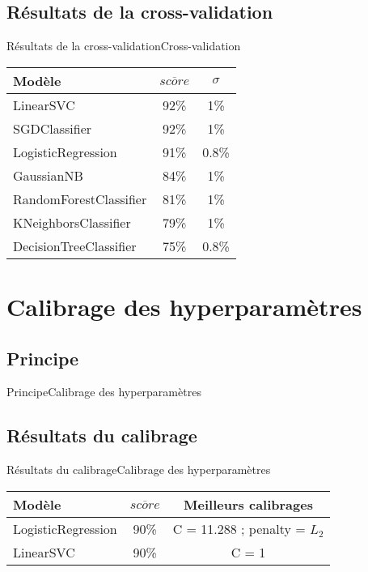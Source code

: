\documentclass[usenames,dvipsnames]{beamer}
\newcommand*\mean[1]{\overline{#1}}
\begin{document}
\subsection{Résultats de la cross-validation}
\begin{frame}{Résultats de la cross-validation}{Cross-validation}
\begin{table}
  \centering
  \begin{tabular}{|p{5cm}|c|c|}
    \hline
    \textbf{Modèle} & $\mean{score}$ & $\sigma$\\
    \hline
    \hline
    LinearSVC & 92\% & 1\%\\
    \hline
    SGDClassifier & 92\% & 1\%\\
    \hline
    LogisticRegression & 91\% & 0.8\%\\
    \hline
    GaussianNB & 84\% & 1\%\\
    \hline
    RandomForestClassifier & 81\% & 1\%\\
    \hline
    KNeighborsClassifier & 79\% & 1\%\\
    \hline
    DecisionTreeClassifier & 75\% & 0.8\%\\
    \hline
  \end{tabular}
\end{table}
\end{frame}

\section{Calibrage des hyperparamètres}
\subsection{Principe}
\begin{frame}{Principe}{Calibrage des hyperparamètres}
\end{frame}

\subsection{Résultats du calibrage}
\begin{frame}{Résultats du calibrage}{Calibrage des hyperparamètres}
\begin{tabular}{|p{5cm}|c|c|}
  \hline
  \textbf{Modèle} & $\mean{score}$ & \textbf{Meilleurs calibrages}\\
  \hline
  \hline
  LogisticRegression & 90\% & C = 11.288 ; penalty = $L_2$\\
  \hline
  LinearSVC & 90\% & C = 1\\
  \hline
\end{tabular}
\end{frame}
\end{document}
